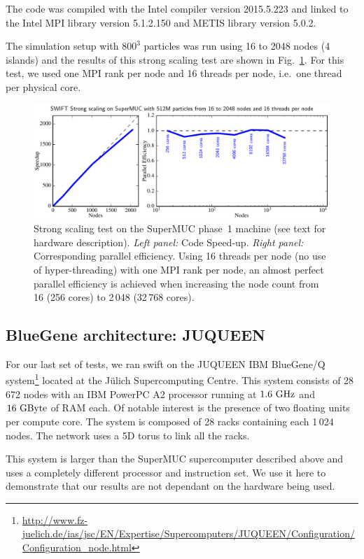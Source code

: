 \documentclass{sig-alternate-05-2015}
\newcommand{\swift}{{\sc swift}\xspace}
\begin{document}
The code was compiled with the Intel compiler version \textsc{2015.5.223} and
linked to the Intel MPI library version \textsc{5.1.2.150} and METIS library
version \textsc{5.0.2}.

The simulation setup with $800^3$ particles was run using 16 to
2048 nodes (4 islands) and the results of this strong scaling test are shown in
Fig.~\ref{fig:superMUC}. For this test, we used one MPI rank per node and 16
threads per node, i.e.~one thread per physical core.

\begin{figure}
\centering
\includegraphics[width=\textwidth]{Figures/scalingSuperMUC}
\caption{Strong scaling test on the SuperMUC phase~1 machine (see text
  for hardware description). \textit{Left panel:} Code
  Speed-up. \textit{Right panel:} Corresponding parallel efficiency.
  Using 16 threads per node (no use of hyper-threading) with one MPI rank
  per node, an almost perfect parallel efficiency is achieved when
  increasing the node count from 16 (256 cores) to 2\,048 (32\,768
  cores).
  \label{fig:superMUC}}
\end{figure}


\subsection{BlueGene architecture: JUQUEEN}

For our last set of tests, we ran \swift on the JUQUEEN IBM BlueGene/Q
system\footnote{\url{http://www.fz-juelich.de/ias/jsc/EN/Expertise/Supercomputers/JUQUEEN/Configuration/Configuration_node.html}}
located at the J\"ulich Supercomputing Centre. This system consists of
28\,672 nodes with an IBM PowerPC A2 processor running at
$1.6~\rm{GHz}$ and $16~\rm{GByte}$ of RAM each. Of notable interest
is the presence of two floating units per compute core. The system is
composed of 28 racks containing each 1\,024 nodes. The network uses a
5D torus to link all the racks.

This system is larger than the SuperMUC supercomputer described above and
uses a completely different processor and instruction set.
We use it here to demonstrate that our results are not dependant
on the hardware being used.
\end{document}
